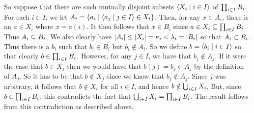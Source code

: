 \begin{questions}
{{      So suppose that there are such mutually disjoint subsets $\angles{X_i \where i \in I}$ of $\prodi B_i$.
      For each $i \in I$, we let $A_i = \braces{a_i \where \angles{a_j \where j \in I} \in X_i}$.
      Then, for any $x \in A_i$, there is an $a \in X_i$ where $x = a(i)$.
      It then follows that $x \in B_i$ since $a \in X_i \ss \prodi B_i$.
      Thus $A_i \ss B_i$.
      We also clearly have $\abs{A_i} \leq \abs{X_i} = \k_i < \l_i = \abs{B_i}$ so that $A_i \pss B_i$.
      Thus there is a $b_i$ such that $b_i \in B_i$ but $b_i \notin A_i$.
      So we define $b = \angles{b_i \where i \in I}$ so that clearly $b \in \prodi B_i$.
      However, for any $j \in I$, we have that $b_j \notin A_j$.
      If it were the case that $b \in X_j$ then we would have that $b(j) = b_j \in A_j$ by the definition of $A_j$.
      So it has to be that $b \notin X_j$ since we know that $b_j \notin A_j$.
      Since $j$ was arbitrary, it follows that $b \notin X_i$ for all $i \in I$, and hence $b \notin \uni X_i$.
      But, since $b \in \prodi B_i$, this contradicts the fact that $\uni X_i = \prodi B_i$.
      The result follows from this contradiction as described above.
    }
  }

\end{questions}

